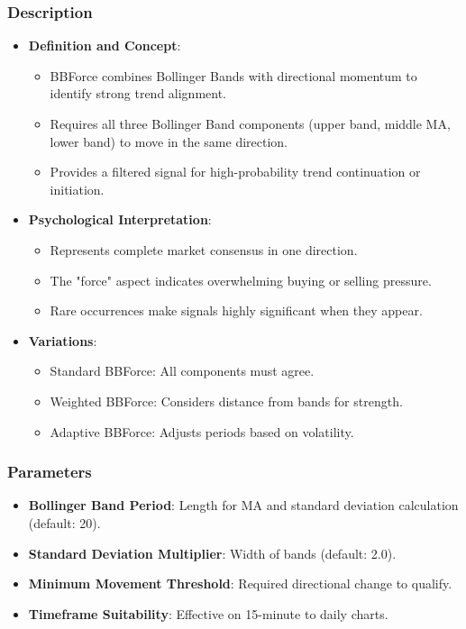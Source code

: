 \documentclass[12pt]{article}
\begin{document}
\subsubsection{Description}
\begin{itemize}
\item \textbf{Definition and Concept}:
  \begin{itemize}
  \item BBForce combines Bollinger Bands with directional momentum to identify strong trend alignment.
  \item Requires all three Bollinger Band components (upper band, middle MA, lower band) to move in the same direction.
  \item Provides a filtered signal for high-probability trend continuation or initiation.
  \end{itemize}
\item \textbf{Psychological Interpretation}:
  \begin{itemize}
  \item Represents complete market consensus in one direction.
  \item The "force" aspect indicates overwhelming buying or selling pressure.
  \item Rare occurrences make signals highly significant when they appear.
  \end{itemize}
\item \textbf{Variations}:
  \begin{itemize}
  \item Standard BBForce: All components must agree.
  \item Weighted BBForce: Considers distance from bands for strength.
  \item Adaptive BBForce: Adjusts periods based on volatility.
  \end{itemize}
\end{itemize}

\subsubsection{Parameters}
\begin{itemize}
\item \textbf{Bollinger Band Period}: Length for MA and standard deviation calculation (default: 20).
\item \textbf{Standard Deviation Multiplier}: Width of bands (default: 2.0).
\item \textbf{Minimum Movement Threshold}: Required directional change to qualify.
\item \textbf{Timeframe Suitability}: Effective on 15-minute to daily charts.
\end{itemize}
\end{document}
